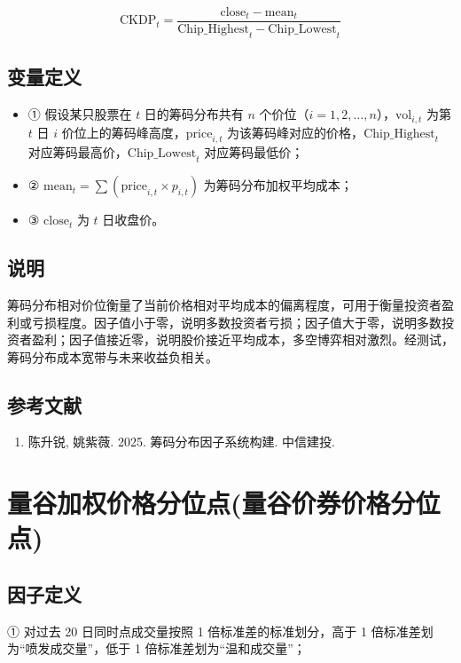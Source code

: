 \documentclass{article}
\begin{document}
\begin{equation}
    \mathrm{CKDP}_t = \frac{\mathrm{close}_t - \mathrm{mean}_t}{\mathrm{Chip\_Highest}_t - \mathrm{Chip\_Lowest}_t}
\end{equation}

\subsection{变量定义}
\begin{itemize}
    \item ① 假设某只股票在 \( t \) 日的筹码分布共有 \( n \) 个价位（\( i=1,2,\ldots,n \)），\( \mathrm{vol}_{i,t} \) 为第 \( t \) 日 \( i \) 价位上的筹码峰高度，\( \mathrm{price}_{i,t} \) 为该筹码峰对应的价格，\( \mathrm{Chip\_Highest}_t \) 对应筹码最高价，\( \mathrm{Chip\_Lowest}_t \) 对应筹码最低价；
    \item ② \( \mathrm{mean}_t = \sum (\mathrm{price}_{i,t} \times p_{i,t}) \) 为筹码分布加权平均成本；
    \item ③ \( \mathrm{close}_t \) 为 \( t \) 日收盘价。
\end{itemize}

\subsection{说明}
筹码分布相对价位衡量了当前价格相对平均成本的偏离程度，可用于衡量投资者盈利或亏损程度。因子值小于零，说明多数投资者亏损；因子值大于零，说明多数投资者盈利；因子值接近零，说明股价接近平均成本，多空博弈相对激烈。经测试，筹码分布成本宽带与未来收益负相关。

\subsection{参考文献}
\begin{enumerate}
    \item 陈升锐, 姚紫薇. 2025. 筹码分布因子系统构建. 中信建投.
\end{enumerate}

\section{量谷加权价格分位点(量谷价券价格分位点)}

\subsection{因子定义}

① 对过去 20 日同时点成交量按照 1 倍标准差的标准划分，高于 1 倍标准差划为“喷发成交量”，低于 1 倍标准差划为“温和成交量”；
\end{document}
